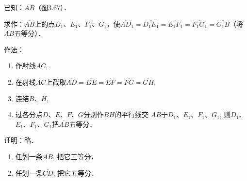 \begin{example}
    已知：$\overline{AB}$（图3.67）．

求作：$\overline{AB}$上的点$D_1$、$E_1$、$F_1$、$G_1$，使$\overline{AD}_1=\overline{D_1E_1}=\overline{E_1F_1}=\overline{F_1G_1}=\overline{G_1B}$（将$\overline{AB}$五等分）．

作法：
\begin{enumerate}
    \item  作射线$AC$,
    \item  在射线$AC$上截取$\overline{AD}=\overline{DE}=\overline{EF}=\overline{FG}=\overline{GH}$,
    \item  连结$B$、$H$,
    \item  过各分点$D$、$E$、$F$、$G$分别作$BH$的平行线交
$\overline{AB}$于$D_1$、$E_1$、$F_1$、$G_1$, 则$D_1$、$E_1$、$F_1$、$G_1$把$\overline{AB}$五等分．
\end{enumerate}

证明：略．
\end{example}

\begin{ex}
\begin{enumerate}
    \item 任划一条$\overline{AB}$, 把它三等分．
    \item 任划一条$\overline{CD}$, 把它五等分．
\end{enumerate}
\end{ex}

